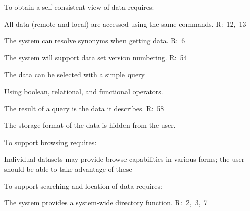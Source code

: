 \begin{list}{}{}

\item To obtain a self-consistent view of  data requires:
\begin{list}{--} {}

\item All data (remote and local) are accessed using the same commands.
R:~12,~13  

\item The system can resolve synonyms when getting data. R:~6

\item The system will support data set version numbering. R:~54

\item The data can be selected with a simple query

\begin{list}{--} {}

     \item Using boolean, relational, and functional operators.

     \item The result of a query is the data it describes. R:~58

\end{list}

\item The storage format of the data is hidden from the user.

\end{list}

\item To support browsing requires:
\begin{list}{--}{}

\item Individual datasets may provide browse capabilities in various forms;
the user should be able to take advantage of these

\end{list}

\item To support searching and location of data requires:
\begin{list}{--}{}

\item The system provides a system-wide directory function.  R:~2,~3,~7

\begin{list}{--}{}


\end{list}
\end{list}
\end{list}
